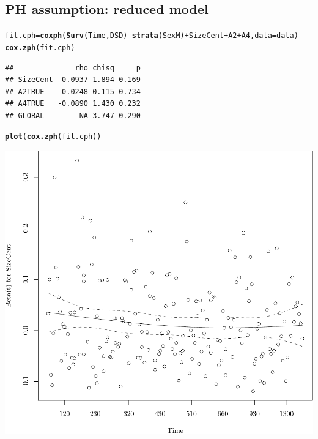 \documentclass{article}\usepackage[]{graphicx}\usepackage[]{color}
\makeatletter
\def\maxwidth{ %
  \ifdim\Gin@nat@width>\linewidth
    \linewidth
  \else
    \Gin@nat@width
  \fi
}
\newcommand{\hlopt}[1]{\textcolor[rgb]{0,0,0}{#1}}%
\newcommand{\hlstd}[1]{\textcolor[rgb]{0.345,0.345,0.345}{#1}}%
\newcommand{\hlkwb}[1]{\textcolor[rgb]{0.69,0.353,0.396}{#1}}%
\newcommand{\hlkwc}[1]{\textcolor[rgb]{0.333,0.667,0.333}{#1}}%
\newcommand{\hlkwd}[1]{\textcolor[rgb]{0.737,0.353,0.396}{\textbf{#1}}}%
\newenvironment{kframe}{%
 \def\at@end@of@kframe{}%
 \ifinner\ifhmode%
  \def\at@end@of@kframe{\end{minipage}}%
  \begin{minipage}{\columnwidth}%
 \fi\fi%
 \def\FrameCommand##1{\hskip\@totalleftmargin \hskip-\fboxsep
 \colorbox{shadecolor}{##1}\hskip-\fboxsep
     \hskip-\linewidth \hskip-\@totalleftmargin \hskip\columnwidth}%
 \MakeFramed {\advance\hsize-\width
   \@totalleftmargin\z@ \linewidth\hsize
   \@setminipage}}%
 {\par\unskip\endMakeFramed%
 \at@end@of@kframe}
\newenvironment{knitrout}{}{} %
\makeatother
\begin{document}
\subsection{PH assumption: reduced model}
\begin{knitrout}
\color{fgcolor}\begin{kframe}
\begin{alltt}
\hlstd{fit.cph} \hlkwb{=} \hlkwd{coxph}\hlstd{(}\hlkwd{Surv}\hlstd{(Time, DSD)} \hlopt{~} \hlkwd{strata}\hlstd{(SexM)} \hlopt{+} \hlstd{SizeCent} \hlopt{+} \hlstd{A2} \hlopt{+} \hlstd{A4,} \hlkwc{data} \hlstd{= data)}
\hlkwd{cox.zph}\hlstd{(fit.cph)}
\end{alltt}
\begin{verbatim}
##              rho chisq     p
## SizeCent -0.0937 1.894 0.169
## A2TRUE    0.0248 0.115 0.734
## A4TRUE   -0.0890 1.430 0.232
## GLOBAL        NA 3.747 0.290
\end{verbatim}
\begin{alltt}
\hlkwd{plot}\hlstd{(}\hlkwd{cox.zph}\hlstd{(fit.cph))}
\end{alltt}
\end{kframe}

{\centering \includegraphics[width=\maxwidth]{figure/05-eda-ph-check-reduced-1} 

}





\end{knitrout}
\end{document}
